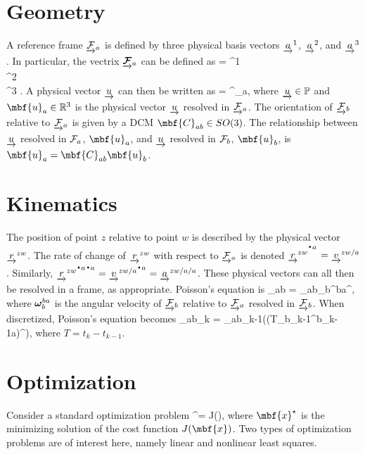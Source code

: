 \section{Geometry}

A reference frame ${\underrightarrow{\mathcal{F}}_{a}}$ is defined by three physical basis vectors ${\underrightarrow{{a}}}^1$, ${\underrightarrow{{a}}}^2$, and ${\underrightarrow{{a}}}^3$. In particular, the vectrix $\underrightarrow{\boldsymbol{\mathcal{F}}}_{a}$ can be defined as \cite{hughes2012}
\bdis
	 = 
		^1 \\
		^2 \\
		^3
	\ema.
\edis
A physical vector ${\underrightarrow{{u}}}$ can then be written as
\bdis
	 = ^{\trans}_a,
\edis
where ${\underrightarrow{{u}}} \in \mathbb{P}$ and $\mbf{u}_a \in \mathbb{R}^3$ is the physical vector ${\underrightarrow{{u}}}$ resolved in ${\underrightarrow{\mathcal{F}}_{a}}$. The orientation of ${\underrightarrow{\mathcal{F}}_{b}}$ relative to ${\underrightarrow{\mathcal{F}}_{a}}$ is given by a DCM $\mbf{C}_{ab} \in SO(3)$. The relationship between ${\underrightarrow{{u}}}$ resolved in $\mathcal{F}_a$, $\mbf{u}_a$, and ${\underrightarrow{{u}}}$ resolved in $\mathcal{F}_b$, $\mbf{u}_b$, is $\mbf{u}_a = \mbf{C}_{ab} \mbf{u}_b$. 


\section{Kinematics}

The position of point $z$ relative to point $w$ is described by the physical vector ${\underrightarrow{{r}}}^{zw}$. The rate of change of ${\underrightarrow{{r}}}^{zw}$ with respect to ${\underrightarrow{\mathcal{F}}_{a}}$ is denoted $\ura{r}^{zw ^\fdot{a}} = \ura{v}^{zw/a}$.  Similarly, $\ura{r}^{zw \fdot{a} \fdot{a}} = \ura{v}^{zw/a \fdot{a}} = \ura{a}^{zw/a/a}$. These physical vectors can all then be resolved in a frame, as appropriate.
Poisson's equation is
\bdis
	_{ab} = _{ab}{\mbs{\omega}_b^{ba}}^\times,
\edis
where $\boldsymbol{\omega}_b^{ba}$ is the angular velocity of ${\underrightarrow{\mathcal{F}}_{b}}$ relative to ${\underrightarrow{\mathcal{F}}_{a}}$ resolved in ${\underrightarrow{\mathcal{F}}_{b}}$. When discretized, Poisson's equation becomes
\bdis
	_{ab_k} = _{ab_{k-1}}\exp\left(\left(T\mbs{\omega}_{b_{k-1}}^{b_{k-1}a}\right)^\times\right),
\edis
where $T = t_k - t_{k-1}$.
\section{Optimization}

Consider a standard optimization problem 
\bdis
	^\star =  \; J(),
\edis
where $\mbf{x}^\star$ is the minimizing solution of the cost function $J(\mbf{x})$. Two types of optimization problems are of interest here, namely linear and nonlinear least squares. 
